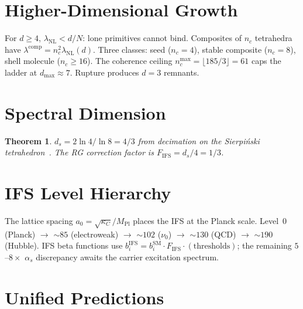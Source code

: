 \documentclass[11pt,twocolumn]{article}
\newtheorem{theorem}{Theorem}
\begin{document}
\section{Higher-Dimensional Growth}
\label{sec:growth}

For $d\geq 4$, $\lambda_{\mathrm{NL}}<d/N$: lone primitives cannot bind.
Composites of $n_c$ tetrahedra have $\lambda^{\mathrm{comp}}=n_c^2\lambda_{\mathrm{NL}}(d)$.
Three classes: seed ($n_c{=}4$), stable composite ($n_c{=}8$), shell molecule ($n_c{\geq}16$).
The coherence ceiling $n_c^{\max}=\lfloor 185/3\rfloor=61$ caps the ladder at $d_{\max}\approx 7$.
Rupture produces $d{=}3$ remnants.


\section{Spectral Dimension}
\label{sec:spectral}

\begin{theorem}
$d_s=2\ln 4/\ln 8=4/3$ from decimation on the Sierpi\'nski tetrahedron~\cite{rammal1984}.
The RG correction factor is $F_{\mathrm{IFS}}=d_s/4=1/3$.
\end{theorem}

\section{IFS Level Hierarchy}
\label{sec:hierarchy}

The lattice spacing $a_0=\sqrt{\kappa_C}/M_{\mathrm{Pl}}$ places the IFS at the Planck scale.
Level~0 (Planck) $\to$ ${\sim}85$ (electroweak) $\to$ ${\sim}102$ ($\nu_0$) $\to$ ${\sim}130$ (QCD) $\to$ ${\sim}190$ (Hubble).
IFS beta functions use $b_i^{\mathrm{IFS}}=b_i^{\mathrm{SM}}\cdot F_{\mathrm{IFS}}\cdot(\text{thresholds})$; the remaining $5$--$8\times$ $\alpha_s$ discrepancy awaits the carrier excitation spectrum.


\section{Unified Predictions}
\label{sec:predictions}
\end{document}
